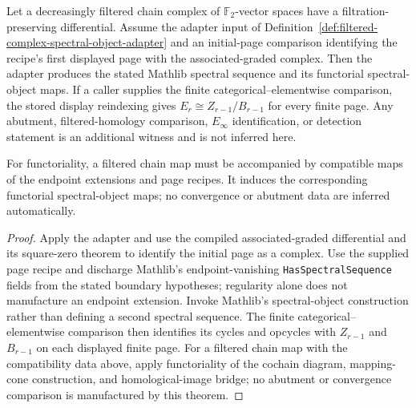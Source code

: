 \begin{theorem}
  \label{thm:filtered-complex-to-spectral-sequence}
  \notready
  Let a decreasingly filtered chain complex of $\mathbb F_2$-vector spaces
  have a filtration-preserving differential.  Assume the adapter input of
  Definition~\ref{def:filtered-complex-spectral-object-adapter} and an
  initial-page comparison identifying the recipe's first displayed page with
  the associated-graded complex.  Then the adapter produces the stated
  Mathlib spectral sequence and its functorial spectral-object maps.  If a
  caller supplies the finite categorical--elementwise comparison, the stored
  display reindexing gives $E_r\cong Z_{r-1}/B_{r-1}$ for every finite page.
  Any abutment, filtered-homology comparison, $E_\infty$ identification, or
  detection statement is an additional witness and is not inferred here.

  For functoriality, a filtered chain map must be accompanied by compatible
  maps of the endpoint extensions and page recipes.  It induces the
  corresponding functorial spectral-object maps; no convergence or abutment
  data are inferred automatically.
\end{theorem}

\begin{proof}
  Apply the adapter and use the compiled associated-graded differential and its
  square-zero theorem to identify the initial page as a complex.  Use the
  supplied page recipe and discharge Mathlib's endpoint-vanishing
  \texttt{HasSpectralSequence} fields from the stated boundary hypotheses;
  regularity alone does not manufacture an endpoint extension.  Invoke
  Mathlib's spectral-object construction rather than defining a second
  spectral sequence.  The finite categorical--elementwise comparison then
  identifies its cycles and opcycles with $Z_{r-1}$ and $B_{r-1}$ on each
  displayed finite page.  For a filtered chain map with the compatibility data
  above, apply functoriality of the cochain diagram, mapping-cone construction,
  and homological-image bridge; no abutment or convergence comparison is
  manufactured by this theorem.
\end{proof}
